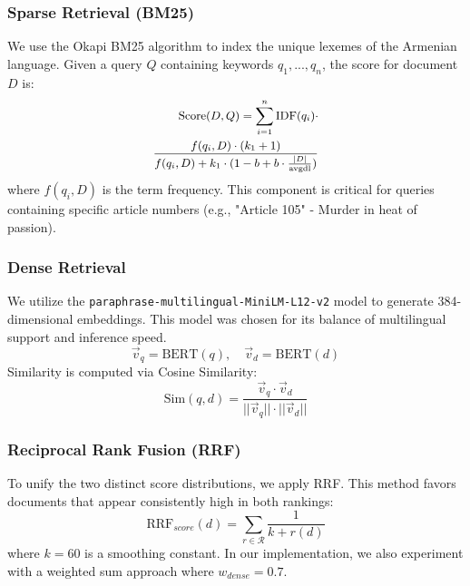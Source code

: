 \documentclass[11pt]{article}
\begin{document}
\subsubsection{Sparse Retrieval (BM25)}
We use the Okapi BM25 algorithm to index the unique lexemes of the Armenian language. Given a query $Q$ containing keywords $q_1, ..., q_n$, the score for document $D$ is:
\begin{equation}
\label{eq:bm25}
\small
\begin{split}
    \text{Score}(D,Q) = \sum_{i=1}^{n} \text{IDF}(q_i) \cdot \\
    \frac{f(q_i, D) \cdot (k_1 + 1)}{f(q_i, D) + k_1 \cdot (1 - b + b \cdot \frac{|D|}{\text{avgdl}})}
\end{split}
\end{equation}
where $f(q_i, D)$ is the term frequency. This component is critical for queries containing specific article numbers (e.g., "Article 105" - Murder in heat of passion).

\subsubsection{Dense Retrieval}
We utilize the \texttt{paraphrase-multilingual-MiniLM-L12-v2} model to generate 384-dimensional embeddings. This model was chosen for its balance of multilingual support and inference speed.
\begin{equation}
    \vec{v}_q = \text{BERT}(q), \quad \vec{v}_d = \text{BERT}(d)
\end{equation}
Similarity is computed via Cosine Similarity:
\begin{equation}
    \text{Sim}(q, d) = \frac{\vec{v}_q \cdot \vec{v}_d}{||\vec{v}_q|| \cdot ||\vec{v}_d||}
\end{equation}

\subsubsection{Reciprocal Rank Fusion (RRF)}
To unify the two distinct score distributions, we apply RRF. This method favors documents that appear consistently high in both rankings:
\begin{equation}
    \text{RRF}_{score}(d) = \sum_{r \in \mathcal{R}} \frac{1}{k + r(d)}
\end{equation}
where $k=60$ is a smoothing constant. In our implementation, we also experiment with a weighted sum approach where $w_{dense}=0.7$.
\end{document}
